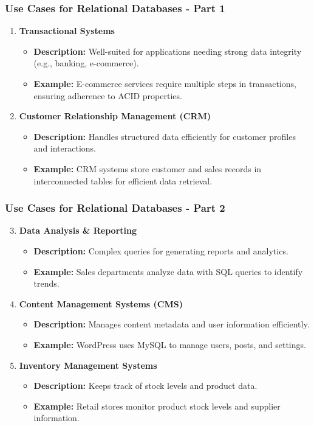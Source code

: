 \documentclass[aspectratio=169]{beamer}
\begin{document}
\begin{frame}[fragile]
    \frametitle{Use Cases for Relational Databases - Part 1}
    \begin{enumerate}
        \item \textbf{Transactional Systems}
            \begin{itemize}
                \item \textbf{Description:} Well-suited for applications needing strong data integrity (e.g., banking, e-commerce).
                \item \textbf{Example:} E-commerce services require multiple steps in transactions, ensuring adherence to ACID properties.
            \end{itemize}
        \item \textbf{Customer Relationship Management (CRM)}
            \begin{itemize}
                \item \textbf{Description:} Handles structured data efficiently for customer profiles and interactions.
                \item \textbf{Example:} CRM systems store customer and sales records in interconnected tables for efficient data retrieval.
            \end{itemize}
    \end{enumerate}
\end{frame}

\begin{frame}[fragile]
    \frametitle{Use Cases for Relational Databases - Part 2}
    \begin{enumerate}
        \setcounter{enumi}{2}
        \item \textbf{Data Analysis \& Reporting}
            \begin{itemize}
                \item \textbf{Description:} Complex queries for generating reports and analytics.
                \item \textbf{Example:} Sales departments analyze data with SQL queries to identify trends.
            \end{itemize}
        \item \textbf{Content Management Systems (CMS)}
            \begin{itemize}
                \item \textbf{Description:} Manages content metadata and user information efficiently.
                \item \textbf{Example:} WordPress uses MySQL to manage users, posts, and settings.
            \end{itemize}
        \item \textbf{Inventory Management Systems}
            \begin{itemize}
                \item \textbf{Description:} Keeps track of stock levels and product data.
                \item \textbf{Example:} Retail stores monitor product stock levels and supplier information.
            \end{itemize}
    \end{enumerate}
\end{frame}
\end{document}
